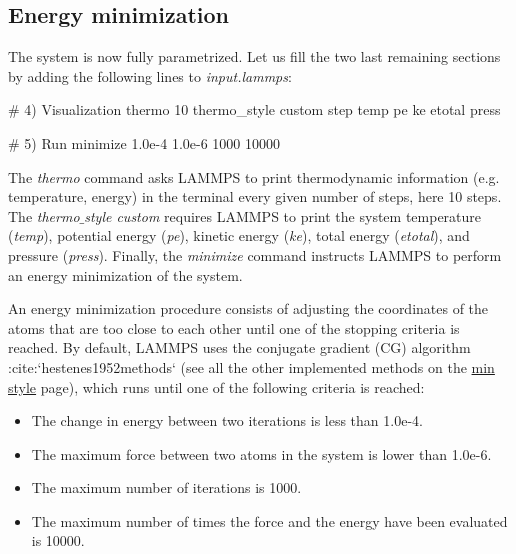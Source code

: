 \subsection{Energy minimization}
\noindent The system is now fully parametrized. Let us fill the two last remaining sections
by adding the following lines to \textit{input.lammps}:

\begin{lcverbatim}
# 4) Visualization
thermo 10
thermo_style custom step temp pe ke etotal press

# 5) Run
minimize 1.0e-4 1.0e-6 1000 10000
\end{lcverbatim}

\noindent The \textit{thermo} command asks LAMMPS to print
thermodynamic information (e.g. temperature, energy) in the
terminal every given number of steps, here 10 steps. 
The \textit{thermo$\_$style custom} requires LAMMPS to print 
the system temperature (\textit{temp}), potential energy (\textit{pe}),
kinetic energy (\textit{ke}), total energy (\textit{etotal}),
and pressure (\textit{press}). Finally, the \textit{minimize} command
instructs LAMMPS to perform an energy minimization of the system.

\begin{tcolorbox}[colback=mylightblue!5!white,colframe=mylightblue!75!black,title=About energy minimization]

\vspace{0.25cm} \noindent An energy minimization procedure consists of adjusting
the coordinates of the atoms that are too close to each other until one of the stopping
criteria is reached. By default, LAMMPS uses the conjugate
gradient (CG) algorithm :cite:`hestenes1952methods` (see all the other
implemented methods on the \href{https://docs.lammps.org/min_style.html}{min style} page), which runs 
until one of the following criteria is reached:

\begin{itemize}
\item The change in energy between two iterations is less than 1.0e-4.
\item The maximum force between two atoms in the system is lower than 1.0e-6.
\item The maximum number of iterations is 1000.
\item The maximum number of times the force and the energy have been evaluated is 10000.
\end{itemize}
\end{tcolorbox}

